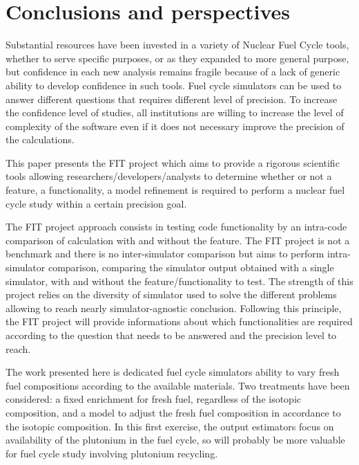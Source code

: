 \section{Conclusions and perspectives}

Substantial resources have been invested in a variety of Nuclear Fuel Cycle
tools, whether to serve specific purposes, or as they expanded to more general
purpose, but confidence in each new analysis remains fragile because of a lack
of generic ability to develop confidence in such tools.
Fuel cycle simulators can be used to answer different questions that requires
different level of precision. To increase the confidence level of studies, all
institutions are willing to increase the level of complexity of the software
even if it does not necessary improve the precision of the calculations. 

This paper presents the FIT project which aims to provide a rigorous scientific
tools allowing researchers/developers/analysts to determine whether or not a
feature, a functionality, a model refinement is required to perform a nuclear
fuel cycle study within a certain precision goal.

The FIT project approach consists in testing code functionality by an intra-code
comparison of calculation with and without the feature. The FIT project is not a
benchmark and there is no inter-simulator comparison but aims to perform
intra-simulator comparison, comparing the simulator output obtained with a single
simulator, with and without the feature/functionality to test. The strength of
this project relies on the diversity of simulator used to solve the different
problems allowing to reach nearly simulator-agnostic conclusion. Following this
principle, the FIT project will provide informations about which functionalities
are required according to the question that needs to be answered and the
precision level to reach.

The work presented here is dedicated fuel cycle simulators ability to vary fresh
fuel compositions according to the available materials. Two treatments have been
considered: a fixed enrichment for fresh fuel, regardless of the isotopic
composition, and a model to adjust the fresh fuel composition in accordance
to the isotopic composition. In this first exercise, the output estimators focus
on availability of the plutonium in the fuel cycle, so will probably be more
valuable for fuel cycle study involving plutonium recycling.

